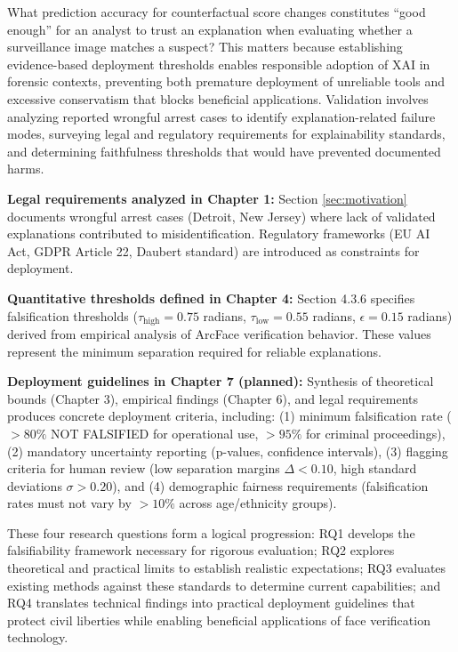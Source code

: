 What prediction accuracy for counterfactual score changes constitutes ``good enough'' for an analyst to trust an explanation when evaluating whether a surveillance image matches a suspect? This matters because establishing evidence-based deployment thresholds enables responsible adoption of XAI in forensic contexts, preventing both premature deployment of unreliable tools and excessive conservatism that blocks beneficial applications. Validation involves analyzing reported wrongful arrest cases to identify explanation-related failure modes, surveying legal and regulatory requirements for explainability standards, and determining faithfulness thresholds that would have prevented documented harms.

\vspace{0.3cm}
\noindent\textbf{Legal requirements analyzed in Chapter 1:} Section \ref{sec:motivation} documents wrongful arrest cases (Detroit, New Jersey) where lack of validated explanations contributed to misidentification. Regulatory frameworks (EU AI Act, GDPR Article 22, Daubert standard) are introduced as constraints for deployment.

\vspace{0.3cm}
\noindent\textbf{Quantitative thresholds defined in Chapter 4:} Section 4.3.6 specifies falsification thresholds ($\tau_{\text{high}} = 0.75$ radians, $\tau_{\text{low}} = 0.55$ radians, $\epsilon = 0.15$ radians) derived from empirical analysis of ArcFace verification behavior. These values represent the minimum separation required for reliable explanations.

\vspace{0.3cm}
\noindent\textbf{Deployment guidelines in Chapter 7 (planned):} Synthesis of theoretical bounds (Chapter 3), empirical findings (Chapter 6), and legal requirements produces concrete deployment criteria, including: (1) minimum falsification rate ($>80\%$ NOT FALSIFIED for operational use, $>95\%$ for criminal proceedings), (2) mandatory uncertainty reporting (p-values, confidence intervals), (3) flagging criteria for human review (low separation margins $\Delta < 0.10$, high standard deviations $\sigma > 0.20$), and (4) demographic fairness requirements (falsification rates must not vary by $>10\%$ across age/ethnicity groups).

\vspace{0.5cm}

These four research questions form a logical progression: RQ1 develops the falsifiability framework necessary for rigorous evaluation; RQ2 explores theoretical and practical limits to establish realistic expectations; RQ3 evaluates existing methods against these standards to determine current capabilities; and RQ4 translates technical findings into practical deployment guidelines that protect civil liberties while enabling beneficial applications of face verification technology.

